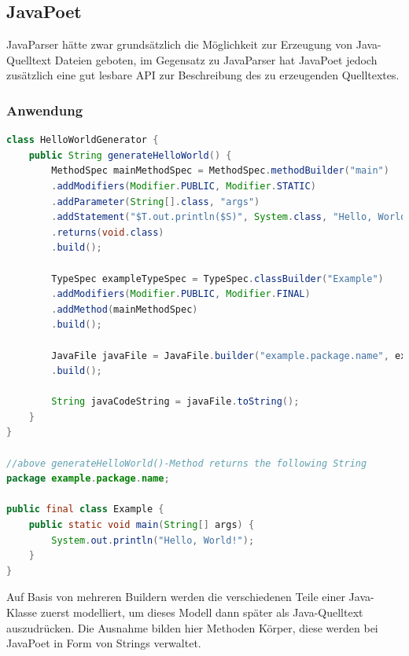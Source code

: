 \documentclass[12pt,oneside,a4paper,parskip]{scrbook}
\begin{document}
\subsection{JavaPoet}

JavaParser hätte zwar grundsätzlich die Möglichkeit zur Erzeugung von Java-Quelltext Dateien geboten, im Gegensatz zu JavaParser hat JavaPoet jedoch zusätzlich eine gut lesbare API zur Beschreibung des zu erzeugenden Quelltextes.

\subsubsection{Anwendung}

\begin{lstlisting}[label=lst:jpoet,
language=java,
firstnumber=1,
caption={Java-Quelltext zur Erzeugung eines \glqq Hallo, Welt!\grqq -Beispiels, angelehnt an das \glqq Hello, JavaPoet!\grqq{} Beispiel in der README.md von\,\cite{javapoet2017}.}]
class HelloWorldGenerator {
	public String generateHelloWorld() {
		MethodSpec mainMethodSpec = MethodSpec.methodBuilder("main")
		.addModifiers(Modifier.PUBLIC, Modifier.STATIC)
		.addParameter(String[].class, "args")
		.addStatement("$T.out.println($S)", System.class, "Hello, World!")
		.returns(void.class)
		.build();
		
		TypeSpec exampleTypeSpec = TypeSpec.classBuilder("Example")
		.addModifiers(Modifier.PUBLIC, Modifier.FINAL)
		.addMethod(mainMethodSpec)
		.build();
		
		JavaFile javaFile = JavaFile.builder("example.package.name", exampleTypeSpec)
		.build();
		
		String javaCodeString = javaFile.toString();
	}
}

//above generateHelloWorld()-Method returns the following String
package example.package.name;

public final class Example {
	public static void main(String[] args) {
		System.out.println("Hello, World!");
	}
}

\end{lstlisting}

Auf Basis von mehreren Buildern werden die verschiedenen Teile einer Java-Klasse zuerst modelliert, um dieses Modell dann später als Java-Quelltext auszudrücken. Die Ausnahme bilden hier Methoden Körper, diese werden bei JavaPoet in Form von Strings verwaltet.
\end{document}
